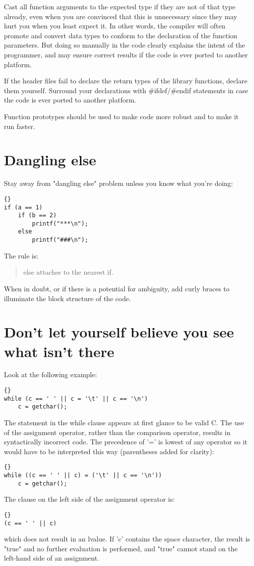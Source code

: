 \documentclass{report}
\begin{document}
Cast all function arguments to the expected type if they are not of that type already, even when you are convinced that this is unnecessary since they may hurt you when you least expect it. In other words, the compiler will often promote and convert data types to conform to the declaration of the function parameters. But doing so manually in the code clearly explains the intent of the programmer, and may ensure correct results if the code is ever ported to another platform.

If the header files fail to declare the return types of the library functions, declare them yourself. Surround your declarations with \#ifdef/\#endif statements in case the code is ever ported to another platform.

Function prototypes should be used to make code more robust and to make it run faster. 

\section{Dangling else}
Stay away from "dangling else" problem unless you know what you're doing: 
\begin{lstlisting}{}
if (a == 1)
    if (b == 2)
        printf("***\n");
    else
        printf("###\n");
\end{lstlisting}
The rule is:
\begin{quote}
else attaches to the nearest if.
\end{quote}
When in doubt, or if there is a potential for ambiguity, add curly braces to illuminate the block structure of the code.

\section{Don't let yourself believe you see what isn't there} 
Look at the following example: 
\begin{lstlisting}{}
while (c == ' ' || c = '\t' || c == '\n')
    c = getchar();
\end{lstlisting}
The statement in the while clause appears at first glance to be valid C. The use of the assignment operator, rather than the comparison operator, results in syntactically incorrect code. The precedence of '=' is lowest of any operator so it would have to be interpreted this way (parentheses added for clarity): 
\begin{lstlisting}{}
while ((c == ' ' || c) = ('\t' || c == '\n'))
    c = getchar();
\end{lstlisting}
The clause on the left side of the assignment operator is: 
\begin{lstlisting}{}
(c == ' ' || c)
\end{lstlisting}
which does not result in an lvalue. If 'c' contains the space character, the result is "true" and no further evaluation is performed, and "true" cannot stand on the left-hand side of an assignment.
\end{document}
